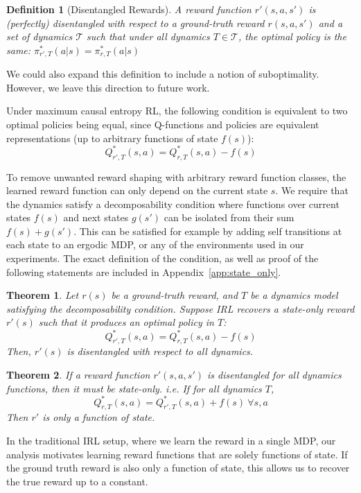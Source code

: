 \documentclass{article} \usepackage{iclr2018_conference,times}
\newtheorem{theorem}{Theorem}[section]
\newtheorem{definition}{Definition}[section]
\begin{document}
\begin{definition}[Disentangled Rewards]
A reward function $r'(s,a,s')$ is (perfectly) disentangled with respect to a ground-truth reward $r(s,a,s')$ and a set of dynamics $\mathcal{T}$ such that under all dynamics $T \in \mathcal{T}$, the optimal policy is the same:
$\pi^*_{r', T}(a|s) = \pi^*_{r, T}(a|s)$
\end{definition}
We could also expand this definition to include a notion of suboptimality. However, we leave this direction to future work.

Under maximum causal entropy RL, the following condition is equivalent to two optimal policies being equal, since Q-functions and policies are equivalent representations (up to arbitrary functions of state $f(s)$):
\[ Q^*_{r', T}(s,a) = Q^*_{r, T}(s,a) - f(s)\]

To remove unwanted reward shaping with arbitrary reward function classes, the learned reward function can only depend on the current state $s$. We require that the dynamics satisfy a decomposability condition where functions over current states $f(s)$ and next states $g(s')$ can be isolated from their sum $f(s) + g(s')$. This can be satisfied for example by adding self transitions at each state to an ergodic MDP, or any of the environments used in our experiments. The exact definition of the condition, as well as proof of the following statements are included in Appendix~\ref{app:state_only}. 

\begin{theorem}
\label{thm:suff}
Let $r(s)$ be a ground-truth reward, and $T$ be a dynamics model satisfying the decomposability condition. Suppose IRL recovers a state-only reward $r'(s)$ such that it produces an optimal policy in $T$:
\[Q^*_{r', T}(s,a) = Q^*_{r, T}(s,a) - f(s)\]
Then, $r'(s)$ is disentangled with respect to all dynamics.
\end{theorem}

\begin{theorem}
\label{thm:necc}
If a reward function $r'(s,a,s')$ is disentangled for all dynamics functions, then it must be state-only. i.e. If for all dynamics $T$,
\[Q^*_{r, T}(s,a) = Q^*_{r', T}(s,a) + f(s)\ \forall{s,a}\]
Then $r'$ is only a function of state.
\end{theorem}

In the traditional IRL setup, where we learn the reward in a single MDP, our analysis motivates learning reward functions that are solely functions of state. If the ground truth reward is also only a function of state, this allows us to recover the true reward up to a constant.
 
\end{document}
